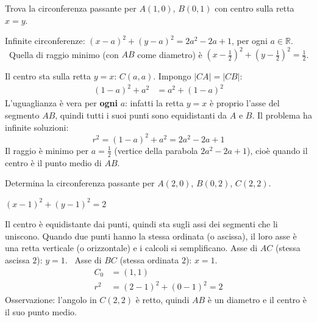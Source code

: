 \begin{question}[ID=2.8, subtitle={Circonferenza per $A(1,0)$ e $B(0,1)$ con centro su $x=y$}, difficulty=media, tags={circonferenza}]
Trova la circonferenza passante per $A(1,0)$, $B(0,1)$ con centro sulla retta $x=y$.
\begin{solution}
Infinite circonferenze: $(x-a)^2+(y-a)^2=2a^2-2a+1$, per ogni $a\in\mathbb{R}$. \ Quella di raggio minimo (con $AB$ come diametro) è $\left(x-\tfrac12\right)^2+\left(y-\tfrac12\right)^2=\tfrac12$.
\end{solution}
\begin{explanation}
Il centro sta sulla retta $y=x$: $C(a,a)$. Impongo $|CA|=|CB|$:
\[\begin{aligned}
(1-a)^2+a^2 &= a^2+(1-a)^2
\end{aligned}\]
L'uguaglianza è vera per \textbf{ogni} $a$: infatti la retta $y=x$ è proprio l'asse del segmento $AB$, quindi tutti i suoi punti sono equidistanti da $A$ e $B$. Il problema ha infinite soluzioni:
\[ r^2=(1-a)^2+a^2=2a^2-2a+1 \]
Il raggio è minimo per $a=\tfrac12$ (vertice della parabola $2a^2-2a+1$), cioè quando il centro è il punto medio di $AB$.
\end{explanation}
\end{question}


\begin{question}[ID=2.9, subtitle={Circonferenza per $A(2,0)$, $B(0,2)$, $C(2,2)$}, difficulty=media, tags={circonferenza}]
Determina la circonferenza passante per $A(2,0)$, $B(0,2)$, $C(2,2)$.
\begin{solution}
$(x-1)^2+(y-1)^2=2$
\end{solution}
\begin{explanation}
Il centro è equidistante dai punti, quindi sta sugli assi dei segmenti che li uniscono. Quando due punti hanno la stessa ordinata (o ascissa), il loro asse è una retta verticale (o orizzontale) e i calcoli si semplificano.
Asse di $AC$ (stessa ascissa $2$): $y=1$. \ Asse di $BC$ (stessa ordinata $2$): $x=1$.
\[\begin{aligned}
C_0 &= (1,1)\\
r^2 &= (2-1)^2+(0-1)^2=2
\end{aligned}\]
Osservazione: l'angolo in $C(2,2)$ è retto, quindi $AB$ è un diametro e il centro è il suo punto medio.
\end{explanation}
\end{question}

